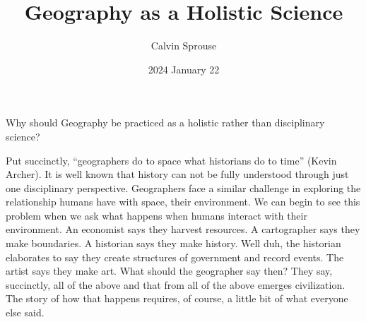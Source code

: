 \documentclass[a4paper, 12pt]{article}
\title{Geography as a Holistic Science}
\author{Calvin Sprouse}
\affil{Geography 101 World Regional Geography}
\date{2024 January 22}
\begin{document}
\maketitle


\doublespacing\noindent
Why should Geography be practiced as a holistic rather than disciplinary science?
\vspace*{1\baselineskip}

Put succinctly, ``geographers do to space what historians do to time'' (Kevin Archer). It is well known that history can not be fully understood through just one disciplinary perspective. Geographers face a similar challenge in exploring the relationship humans have with space, their environment. We can begin to see this problem when we ask what happens when humans interact with their environment. An economist says they harvest resources. A cartographer says they make boundaries. A historian says they make history. Well duh, the historian elaborates to say they create structures of government and record events. The artist says they make art. What should the geographer say then? They say, succinctly, all of the above and that from all of the above emerges civilization. The story of how that happens requires, of course, a little bit of what everyone else said.
\end{document}

